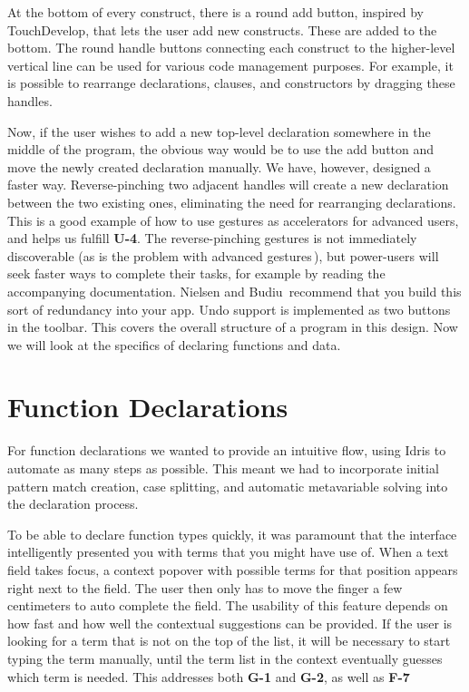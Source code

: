 At the bottom of every construct, there is a round add button, inspired by TouchDevelop, that lets the user add new constructs. These are added to the bottom. 
The round handle buttons connecting each construct to the higher-level vertical line can be used for various code management purposes. 
For example, it is possible to rearrange declarations, clauses, and constructors by dragging these handles. 

Now, if the user wishes to add a new top-level declaration somewhere in the middle of the program, the obvious way would be to use the add button and move the newly created declaration manually. We have, however, designed a faster way.
Reverse-pinching two adjacent handles will create a new declaration between the two existing ones, eliminating the need for rearranging declarations. 
This is a good example of how to use gestures as accelerators for advanced users, and helps us fulfill \textbf{U-4}.
The reverse-pinching gestures is not immediately discoverable (as is the problem with advanced gestures\,\cite[p 141]{nielsen2013mobile}), but power-users will seek faster ways to complete their tasks, for example by reading the accompanying documentation. 
Nielsen and Budiu\,\cite[p 143]{nielsen2013mobile} recommend that you build this sort of redundancy into your app. 
Undo support is implemented as two buttons in the toolbar.
This covers the overall structure of a program in this design. Now we will look at the specifics of declaring functions and data.


\section{Function Declarations}
For function declarations we wanted to provide an intuitive flow, using Idris to automate as many steps as possible. 
This meant we had to incorporate initial pattern match creation, case splitting, and automatic metavariable solving into the declaration process.

To be able to declare function types quickly, it was paramount that the interface intelligently presented you with terms that you might have use of.
When a text field takes focus, a context popover with possible terms for that position appears right next to the field. 
The user then only has to move the finger a few centimeters to auto complete the field. 
The usability of this feature depends on how fast and how well the contextual suggestions can be provided.
If the user is looking for a term that is not on the top of the list, it will be necessary to start typing the term manually, until the term list in the context eventually guesses which term is needed. This addresses both \textbf{G-1} and \textbf{G-2}, as well as \textbf{F-7}

